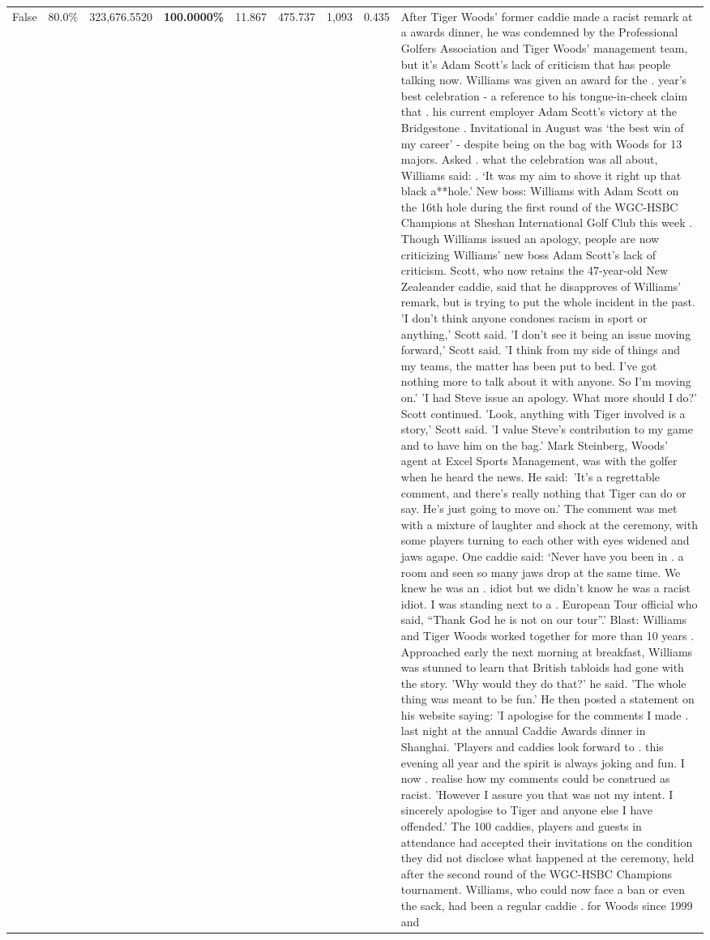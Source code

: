\begin{table}[H]
\begin{tabular}{lllrlllll}
False & 80.0\% & 323,676.5520 & \bfseries \color{red} 100.0000\% & 11.867 & 475.737 & 1,093 & 0.435 & After Tiger Woods' former caddie made a racist remark at a awards dinner, he was condemned by the Professional Golfers Association and Tiger Woods' management team, but it's Adam Scott's lack of criticism that has people talking now. Williams was given an award for the . year’s best celebration - a reference to his tongue-in-cheek claim that . his current employer Adam Scott’s victory at the Bridgestone . Invitational in August was ‘the best win of my career’ - despite being on the bag with Woods for 13 majors. Asked . what the celebration was all about, Williams said: . ‘It was my aim to shove it right up that black a**hole.’ New boss: Williams with Adam Scott  on the 16th hole during the first round of the WGC-HSBC Champions at Sheshan International Golf Club this week . Though Williams issued an apology, people are now criticizing Williams' new boss Adam Scott's lack of criticism. Scott, who now retains the 47-year-old New Zealeander caddie, said that he disapproves of Williams' remark, but is trying to put the whole incident in the past. 'I don't think anyone condones racism in sport or anything,' Scott said. 'I don't see it being an issue moving forward,' Scott said. 'I think from my side of things and my teams, the matter has been put to bed. I've got nothing more to talk about it with anyone. So I'm moving on.' 'I had Steve issue an apology. What more should I do?' Scott continued. 'Look, anything with Tiger involved is a story,' Scott said. 'I value Steve's contribution to my game and to have him on the bag.' Mark Steinberg, Woods' agent at Excel Sports Management, was with the golfer when he heard the news. He said: 'It's a regrettable comment, and there's really nothing that Tiger can do or say. He's just going to move on.' The comment was met with a mixture of laughter and shock at the ceremony, with some players turning to each other with eyes widened and jaws agape. One caddie said: ‘Never have you been in . a room and seen so many jaws drop at the same time. We knew he was an . idiot but we didn’t know he was a racist idiot. I was standing next to a . European Tour official who said, “Thank God he is not on our tour”.’ Blast: Williams and Tiger Woods worked together for more than 10 years . Approached early the next morning at breakfast, Williams was stunned to learn that British tabloids had gone with the story. 'Why would they do that?' he said. 'The whole thing was meant to be fun.' He then posted a statement on his website saying: 'I apologise for the comments I made . last night at the annual Caddie Awards dinner in Shanghai. 'Players and caddies look forward to . this evening all year and the spirit is always joking and fun. I now . realise how my comments could be construed as racist. 'However I assure you that was not my intent. I sincerely apologise to Tiger and anyone else I have offended.' The 100 caddies, players and guests in attendance had accepted their invitations on the condition they did not disclose what happened at the ceremony, held after the second round of the WGC-HSBC Champions tournament. Williams, who could now face a ban or even the sack, had been a regular caddie . for Woods since 1999 and 
\end{tabular}
\end{table}
